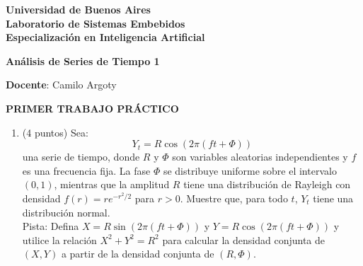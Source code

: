 \documentclass[9pt]{extarticle}
\begin{document}
{\huge\textbf{Universidad de Buenos Aires}}\\[14.1pt]
{\huge\textbf{Laboratorio de Sistemas Embebidos}}\\[14.1pt]
{\huge\textbf{Especialización en Inteligencia Artificial}}

\vspace{2ex}\vspace{3.5pt}
\textbf{Análisis de Series de Tiempo 1}

\vspace{1.5ex}\vspace{5.3pt}
\textbf{Docente}: Camilo Argoty

\vspace{1ex}\vspace{7.1pt}
\hspace*{35pt}

\vspace{2ex}\vspace{-3.3pt}
\begin{center}\hspace*{-15pt}\textbf{PRIMER TRABAJO PRÁCTICO}\end{center}\vspace{-5.7pt}

\begin{enumerate}
\item (4 puntos) Sea:
\[ Y_t = R\cos(2\pi(ft+\Phi)) \]
una serie de tiempo, donde $R$ y $\Phi$ son variables aleatorias independientes y $f$ es una frecuencia fija. La fase $\Phi$ se distribuye uniforme sobre el intervalo $(0,1)$, mientras que la amplitud $R$ tiene una distribución de Rayleigh con densidad $f(r) = re^{-r^2/2}$ para $r>0$. Muestre que, para todo $t$, $Y_t$ tiene una distribución normal.\\
Pista: Defina $X = R\sin(2\pi(ft+\Phi))$ y $Y = R\cos(2\pi(ft+\Phi))$ y utilice la relación $X^2+Y^2=R^2$ para calcular la densidad conjunta de $(X,Y)$ a partir de la densidad conjunta de $(R,\Phi)$.
\end{enumerate}

\hrulefill
\end{document}
